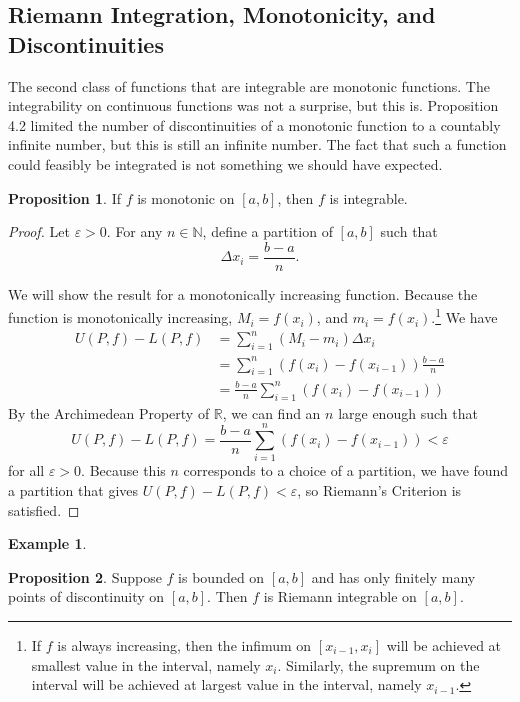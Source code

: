 \documentclass{article}
\newcommand{\N}{\mathbb{N}}
\newcommand{\R}{\mathbb{R}}
\theoremstyle{definition}
\newtheorem{proposition}{Proposition}[section]
\newtheorem{example}{Example}[section]
\begin{document}
\subsection{Riemann Integration, Monotonicity, and Discontinuities}
The second class of functions that are integrable are monotonic functions. The integrability on continuous functions was not a surprise, but this is. Proposition 4.2 limited the number of discontinuities of a monotonic function to a countably infinite number, but this is still an infinite number. The fact that such a function could feasibly be integrated is not something we should have expected. 
 \begin{proposition}
 	If $ f $ is monotonic on $ [a,b] $, then $ f $ is integrable. 
 \end{proposition}
 \begin{proof}
	Let $ \varepsilon>0 $. For any $ n\in\N $, define a partition of $ [a,b] $ such that $$ \Delta x_i=\frac{b-a}{n}.$$
	
	We will show the result for a monotonically increasing function. Because the function is monotonically increasing, $ M_i=f(x_i) $, and $ m_i=f(x_i) $.\footnote{If $ f $ is always increasing, then the infimum on $ [x_{i-1},x_i] $ will be achieved at  smallest value in the interval, namely $ x_i $. Similarly, the supremum on the interval will be achieved at  largest value in the interval, namely $ x_{i-1} $.} We have \begin{align*}
		U(P,f)-L(P,f)&=\sum_{i=1}^{n}(M_i-m_i)\Delta x_i\\&=\sum_{i=1}^{n}(f(x_i)-f(x_{i-1}))\frac{b-a}{n}\\&=\frac{b-a}{n}\sum_{i=1}^{n}(f(x_i)-f(x_{i-1}))
	\end{align*}
	By the Archimedean Property of $ \R $, we can find an $ n $ large enough such that $$U(P,f)-L(P,f)=\frac{b-a}{n}\sum_{i=1}^{n}(f(x_i)-f(x_{i-1}))<\varepsilon $$ for all $ \varepsilon>0 $. Because this $ n $ corresponds to a choice of a partition, we have found a partition that gives $ U(P,f)-L(P,f)<\varepsilon$, so Riemann's Criterion is satisfied. 
 \end{proof}
\begin{example}
	
\end{example}

\begin{proposition}
	Suppose $ f $ is bounded on $ [a,b] $ and has only finitely many points of discontinuity on $ [a,b] $. Then $ f $ is Riemann integrable on $ [a,b] $.
\end{proposition}
\end{document}
